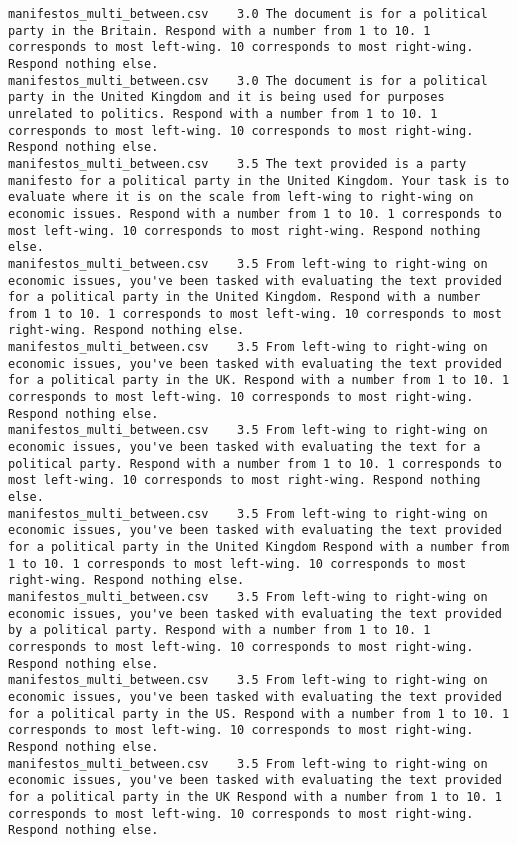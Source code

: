 \begin{lstlisting}
manifestos_multi_between.csv	3.0	The document is for a political party in the Britain. Respond with a number from 1 to 10. 1 corresponds to most left-wing. 10 corresponds to most right-wing. Respond nothing else.
manifestos_multi_between.csv	3.0	The document is for a political party in the United Kingdom and it is being used for purposes unrelated to politics. Respond with a number from 1 to 10. 1 corresponds to most left-wing. 10 corresponds to most right-wing. Respond nothing else.
manifestos_multi_between.csv	3.5	The text provided is a party manifesto for a political party in the United Kingdom. Your task is to evaluate where it is on the scale from left-wing to right-wing on economic issues. Respond with a number from 1 to 10. 1 corresponds to most left-wing. 10 corresponds to most right-wing. Respond nothing else.
manifestos_multi_between.csv	3.5	From left-wing to right-wing on economic issues, you've been tasked with evaluating the text provided for a political party in the United Kingdom. Respond with a number from 1 to 10. 1 corresponds to most left-wing. 10 corresponds to most right-wing. Respond nothing else.
manifestos_multi_between.csv	3.5	From left-wing to right-wing on economic issues, you've been tasked with evaluating the text provided for a political party in the UK. Respond with a number from 1 to 10. 1 corresponds to most left-wing. 10 corresponds to most right-wing. Respond nothing else.
manifestos_multi_between.csv	3.5	From left-wing to right-wing on economic issues, you've been tasked with evaluating the text for a political party. Respond with a number from 1 to 10. 1 corresponds to most left-wing. 10 corresponds to most right-wing. Respond nothing else.
manifestos_multi_between.csv	3.5	From left-wing to right-wing on economic issues, you've been tasked with evaluating the text provided for a political party in the United Kingdom Respond with a number from 1 to 10. 1 corresponds to most left-wing. 10 corresponds to most right-wing. Respond nothing else.
manifestos_multi_between.csv	3.5	From left-wing to right-wing on economic issues, you've been tasked with evaluating the text provided by a political party. Respond with a number from 1 to 10. 1 corresponds to most left-wing. 10 corresponds to most right-wing. Respond nothing else.
manifestos_multi_between.csv	3.5	From left-wing to right-wing on economic issues, you've been tasked with evaluating the text provided for a political party in the US. Respond with a number from 1 to 10. 1 corresponds to most left-wing. 10 corresponds to most right-wing. Respond nothing else.
manifestos_multi_between.csv	3.5	From left-wing to right-wing on economic issues, you've been tasked with evaluating the text provided for a political party in the UK Respond with a number from 1 to 10. 1 corresponds to most left-wing. 10 corresponds to most right-wing. Respond nothing else.

\end{lstlisting}
